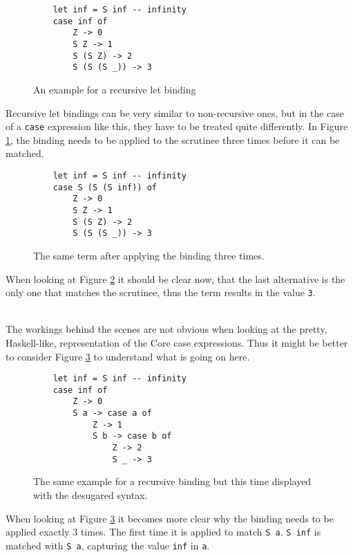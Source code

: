 \begin{figure}[!ht]
\begin{verbatim}
    let inf = S inf -- infinity
    case inf of
        Z -> 0
        S Z -> 1
        S (S Z) -> 2
        S (S (S _)) -> 3
\end{verbatim}
    \caption{An example for a recursive let binding}
    \label{fig:recLetExample}
\end{figure}

Recursive let bindings can be very similar to non-recursive ones,
but in the case of a \texttt{case} expression like this,
they have to be treated quite differently.
In Figure \ref*{fig:recLetExample},
the binding needs to be applied to the scrutinee three times before it can be matched.

\begin{figure}[!ht]
\begin{verbatim}
    let inf = S inf -- infinity
    case S (S (S inf)) of
        Z -> 0
        S Z -> 1
        S (S Z) -> 2
        S (S (S _)) -> 3
\end{verbatim}
    \caption{The same term after applying the binding three times.}
    \label{fig:recLetExampleApplied}
\end{figure}

When looking at Figure \ref*{fig:recLetExampleApplied} it should be clear now,
that the last alternative is the only one that matches the scrutinee,
thus the term results in the value \texttt{3}.

\ \\
The workings behind the scenes are not obvious when looking at the pretty, Haskell-like, representation of the Core case expressions.
Thus it might be better to consider Figure \ref*{fig:recLetExampleDesugared} to understand what is going on here.

\begin{figure}[!ht]
\begin{verbatim}
    let inf = S inf -- infinity
    case inf of
        Z -> 0
        S a -> case a of
            Z -> 1
            S b -> case b of
                Z -> 2
                S _ -> 3
\end{verbatim}
    \caption{The same example for a recursive binding but this time displayed with the desugared syntax.}
    \label{fig:recLetExampleDesugared}
\end{figure}

When looking at Figure \ref*{fig:recLetExampleDesugared} it becomes more clear why the binding needs to be applied exactly 3 times.
The first time it is applied to match \texttt{S a}.
\texttt{S inf} is matched with \texttt{S a},
capturing the value \texttt{inf} in \texttt{a}.

